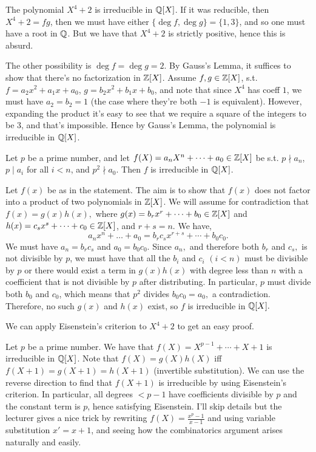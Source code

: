 \begin{example}
  The polynomial $X^4+2$ is irreducible in $\mathbb Q[X]$. If it was reducible, then $X^4+2=fg$,
  then we must have either $\{\deg f, \deg g\}=\{1,3\}$, and so one must have a root in
  $\mathbb Q$. But we have that $X^4+2$ is strictly positive, hence this is absurd. 

  The other possibility is $\deg f=\deg g=2$. By Gauss's Lemma, it suffices to show that
  there's no factorization in $\mathbb Z[X]$. Assume $f,g\in\mathbb Z[X]$, s.t. $f=a_2x^2+a_1x+a_0$,
  $g=b_2x^2+b_1x+b_0$, and note that since $X^4$ has coeff $1$, we must have $a_2=b_2=1$
  (the case where they're both $-1$ is equivalent). However, expanding the product it's
  easy to see that we require a square of the integers to be $3$, and that's impossible.
  Hence by Gauss's Lemma, the polynomial is irreducible in $\mathbb Q[X]$.
\end{example}

\begin{theorem}
  Let $p$ be a prime number, and let $f(X)=a_nX^n+\cdots+a_0\in \mathbb Z[X]$ be s.t.
  $p\nmid a_n$, $p\mid a_i$ for all $i<n$, and $p^2\nmid a_0$. Then $f$ is
  irreducible in $\mathbb Q[X]$.
  \label{thm:eisensteinCriterion}
\end{theorem}
Let $f(x)$ be as in the statement. The aim is to show that $f(x)$ does not factor into a product of two polynomials in $\mathbb Z[X]$. We will assume for contradiction that $f(x)=g(x)h(x),$ where $g(x)=b_rx^r+\cdots +b_0 \in \mathbb Z[X]$ and $h(x)=c_sx^s+\cdots +c_0 \in \mathbb Z[X]$, and $r+s=n.$ We have, $$a_nx^n+\ldots +a_0 = b_rc_sx^{r+s}+\cdots +b_0c_0.$$ We must have $a_n=b_rc_s$ and $a_0=b_0c_0.$ Since $a_n,$ and therefore both $b_r$ and $c_s,$ is not divisible by $p$, we must have that all the $b_i$ and $c_i$ $(i < n)$ must be divisible by $p$ or there would exist a term in $g(x)h(x)$ with degree less than $n$ with a coefficient that is not divisible by $p$ after distributing. In particular, $p$ must divide both $b_0$ and $c_0$, which means that $p^2$ divides $b_0c_0=a_0,$ a contradiction. Therefore, no such $g(x)$ and $h(x)$ exist, so $f$ is irreducible in $\mathbb Q[X].$



\begin{example}
  We can apply Eisenstein's criterion to $X^4+2$ to get an easy proof. 
\end{example}
\begin{example}
  Let $p$ be a prime number. We have that $f(X)=X^{p-1}+\cdots+X+1$ is irreducible in
  $\mathbb Q[X]$. Note that $f(X)=g(X)h(X)$ iff $f(X+1)=g(X+1)=h(X+1)$ (invertible
  substitution). We can use the reverse direction to find that $f(X+1)$ is irreducible by
  using Eisenstein's criterion. In particular, all degrees $<p-1$ have coefficients
  divisible by $p$ and the constant term is $p$, hence satisfying Eisenstein. I'll skip
  details but the lecturer gives a nice trick by rewriting $f(X)=\frac{x^p-1}{x-1}$ and
  using variable substitution $x'=x+1$, and seeing how the combinatorics argument arises
  naturally and easily.
\end{example}

